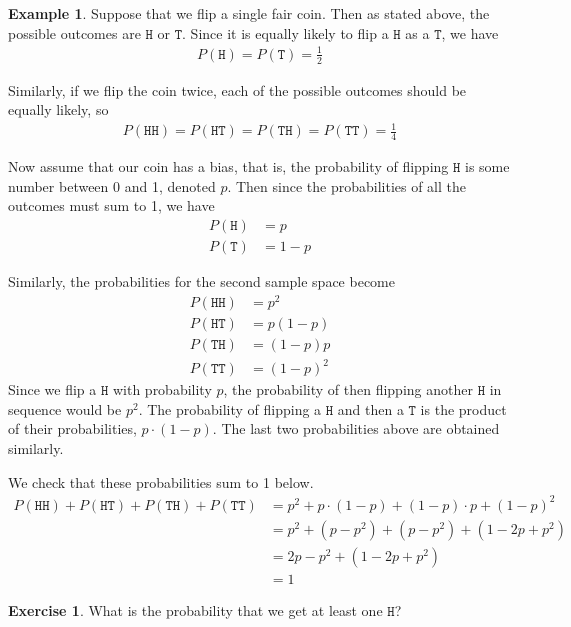 \documentclass{tufte-book}
\newcommand\hd{\texttt{H}}
\newcommand\tl{\texttt{T}}
\theoremstyle{definition}
\numberwithin{theorem}{section}
\numberwithin{definition}{section}
\numberwithin{lemma}{section}
\numberwithin{corollary}{section}
\numberwithin{proposition}{section}
\numberwithin{remark}{section}
\numberwithin{claim}{section}
\numberwithin{observation}{section}
\numberwithin{fact}{section}
\numberwithin{assumption}{section}
\newtheorem{example}[theorem]{Example}
\numberwithin{example}{section}
\newtheorem{exercise}[theorem]{Exercise}
\numberwithin{exercise}{section}
\begin{document}
\begin{example}
Suppose that we flip a single fair coin. Then as stated above, the possible outcomes are $\hd$ or $\tl$. Since it is equally likely to flip a $\hd$ as a $\tl$, we have
\begin{align*}
P(\hd) = P(\tl) = \frac{1}{2}
\end{align*}

Similarly, if we flip the coin twice, each of the possible outcomes should be equally likely, so
\begin{align*}
P(\hd \hd) = P(\hd \tl) = P(\tl \hd) = P(\tl \tl) = \frac{1}{4}
\end{align*}

Now assume that our coin has a bias, that is, the probability of flipping $\hd$ is some number between 0 and 1, denoted $p$. Then since the probabilities of all the outcomes must sum to 1, we have
\begin{align*}
P(\hd) &= p \\
P(\tl) &= 1-p
\end{align*}

Similarly, the probabilities for the second sample space become
\begin{align*}
P(\hd \hd) &= p^2 \\
P(\hd \tl) &= p (1-p) \\
P(\tl \hd) &= (1-p) p \\
P(\tl \tl) &= (1-p)^2 
\end{align*}
Since we flip a $\hd$ with probability $p$, the probability of then flipping another $\hd$ in sequence would be $p^2$. The probability of flipping a $\hd$ and then a $\tl$ is the product of their probabilities, $p\cdot (1-p)$. The last two probabilities above are obtained similarly.

We check that these probabilities sum to 1 below.
\begin{align*}
P(\hd \hd) + P(\hd \tl ) + P(\tl \hd) + P(\tl \tl) &= p^2 + p\cdot (1-p) + (1-p) 
\cdot p + (1-p)^2 \\
&= p^2 + (p - p^2) + (p - p^2) + (1 - 2p + p^2) \\
&= 2p - p^2 + (1 - 2p + p^2) \\
&= 1
\end{align*}
\end{example}


\begin{exercise}
What is the probability that we get at least one $\hd$?
\end{exercise}
\end{document}
